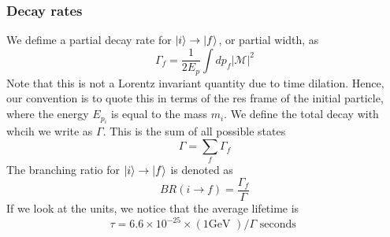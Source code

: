 \subsubsection{Decay rates} 
We defime a partial decay rate for $ \ket{ i } \to \ket{ f } $, 
or partial width, as 
\[
\Gamma _f = \frac{1}{ 2 E_ p } \int d p _ f | \mathcal{ M } | ^ 2  
\] Note that this is not a Lorentz invariant 
quantity due to time dilation. 
Hence, our convention is to quote this in terms 
of the res frame of the initial particle, 
where the energy $E _{ p _ i } $ is equal to 
the mass $ m _ i $. 
We define the total decay with whcih we write as  $ \Gamma $. 
This is the sum of all possible states 
 \[
\Gamma = \sum _ f  \Gamma _ f  
\]
The branching ratio for $\ket{ i } \to \ket { f} $ is denoted as 
\[
 BR ( i \to f )  = \frac{\Gamma_ f }{ \Gamma}
\] If we look at the units, we notice that the average 
lifetime is 
\[
	\tau = 6.6 \times 10 ^{ - 25 } \times ( 1 \text{GeV } ) / \Gamma \text{ seconds }
\]

\pagebreak
